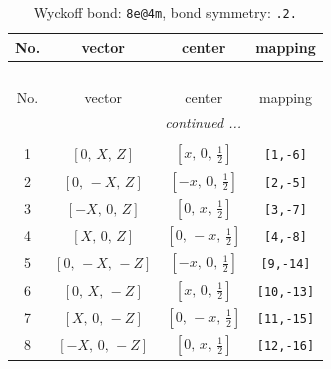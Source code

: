 \documentclass[fleqn,8pt]{jsarticle}
\begin{document}
\begin{longtable}{cccc}
\caption{Wyckoff bond: {\tt 8e@4m}, bond symmetry: {\tt .2.}}
 \\
 \hline \hline
No. & vector & center & mapping \\ \hline \endfirsthead

\multicolumn{3}{l}{\tablename\ \thetable{}} \\
 \hline \hline
No. & vector & center & mapping \\ \hline \endhead

 \hline \hline
\multicolumn{3}{r}{\footnotesize\it continued ...} \\ \endfoot

 \hline \hline
\multicolumn{3}{r}{} \\ \endlastfoot

1 & $\left[ 0,\, X,\, Z \right]$ & $\left[ x,\, 0,\, \frac{1}{2} \right]$ & {\tt [1,-6]} \\ \hline
2 & $\left[ 0,\, - X,\, Z \right]$ & $\left[ - x,\, 0,\, \frac{1}{2} \right]$ & {\tt [2,-5]} \\ \hline
3 & $\left[ - X,\, 0,\, Z \right]$ & $\left[ 0,\, x,\, \frac{1}{2} \right]$ & {\tt [3,-7]} \\ \hline
4 & $\left[ X,\, 0,\, Z \right]$ & $\left[ 0,\, - x,\, \frac{1}{2} \right]$ & {\tt [4,-8]} \\ \hline
5 & $\left[ 0,\, - X,\, - Z \right]$ & $\left[ - x,\, 0,\, \frac{1}{2} \right]$ & {\tt [9,-14]} \\ \hline
6 & $\left[ 0,\, X,\, - Z \right]$ & $\left[ x,\, 0,\, \frac{1}{2} \right]$ & {\tt [10,-13]} \\ \hline
7 & $\left[ X,\, 0,\, - Z \right]$ & $\left[ 0,\, - x,\, \frac{1}{2} \right]$ & {\tt [11,-15]} \\ \hline
8 & $\left[ - X,\, 0,\, - Z \right]$ & $\left[ 0,\, x,\, \frac{1}{2} \right]$ & {\tt [12,-16]} \\
\end{longtable}
\renewcommand{\arraystretch}{1.2}
\end{document}
